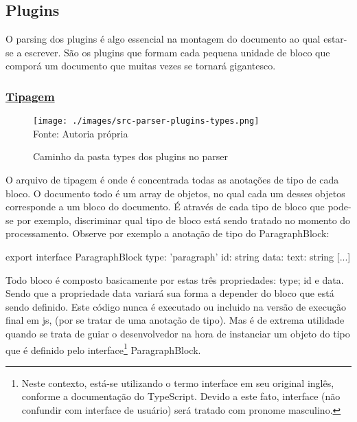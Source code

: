 \subsection{Plugins}

O parsing dos plugins é algo essencial na montagem
do documento ao qual estar-se a escrever. São os plugins
que formam cada pequena unidade de bloco que comporá
um documento que muitas vezes se tornará gigantesco.

\subsubsection{\underline{Tipagem}}

\begin{figure}[H]
    \centering
    \caption{Caminho da pasta types dos plugins no parser}
    \texttt{[image: ./images/src-parser-plugins-types.png]}
    \label{fig:src-parser-plugins-types} \\
    \textnormal{\fontsize{10pt}{12pt}Fonte: Autoria própria}
\end{figure}

O arquivo de tipagem é onde é concentrada todas as anotações
de tipo de cada bloco. O documento todo é um array de objetos,
no qual cada um desses objetos corresponde a um bloco
do documento. É através de cada tipo de bloco que pode-se por exemplo,
discriminar qual tipo de bloco está sendo tratado no momento do processamento.
Observe por exemplo a anotação de tipo do ParagraphBlock:

\begin{ParagraphBlockCode}
[...]
export interface ParagraphBlock {
    type: 'paragraph'
    id: string
    data: {
        text: string
    }
}
[...]
\end{ParagraphBlockCode}

Todo bloco é composto basicamente por estas três propriedades:
type; id e data. Sendo que a propriedade data variará sua
forma a depender do bloco que está sendo definido. Este código
nunca é executado ou incluido na versão de execução final em
\acrshort{js},
(por se tratar de uma anotação de tipo). Mas é de extrema
utilidade quando se trata de guiar o desenvolvedor na hora
de instanciar um objeto do tipo que é definido pelo
interface\footnote{Neste contexto, está-se utilizando o termo interface em seu original
    inglês, conforme a documentação do TypeScript. Devido a este fato,
    interface (não confundir com interface de usuário) será tratado
    com pronome masculino.
}
ParagraphBlock.

